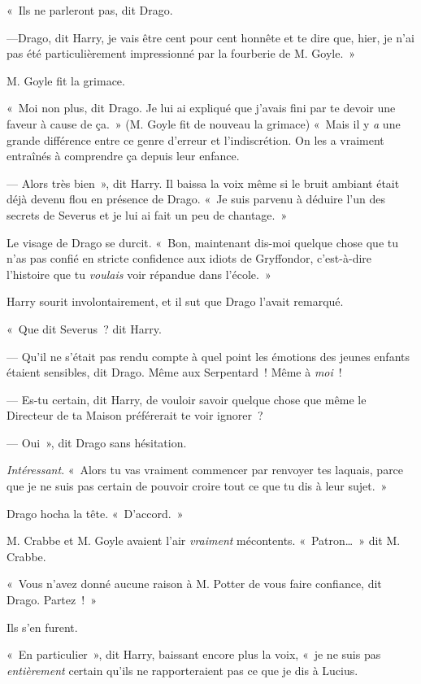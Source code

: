 «~Ils ne parleront pas, dit Drago.

---Drago, dit Harry, je vais être cent pour cent honnête et te dire que, hier, je n'ai pas été particulièrement impressionné par la fourberie de M. Goyle.~»

M. Goyle fit la grimace.

«~Moi non plus, dit Drago. Je lui ai expliqué que j'avais fini par te devoir une faveur à cause de ça.~» (M. Goyle fit de nouveau la grimace) «~Mais il y \emph{a} une grande différence entre ce genre d'erreur et l'indiscrétion. On les a vraiment entraînés à comprendre ça depuis leur enfance.

--- Alors très bien~», dit Harry. Il baissa la voix même si le bruit ambiant était déjà devenu flou en présence de Drago. «~Je suis parvenu à déduire l'un des secrets de Severus et je lui ai fait un peu de chantage.~»

Le visage de Drago se durcit. «~Bon, maintenant dis-moi quelque chose que tu n'as pas confié en stricte confidence aux idiots de Gryffondor, c'est-à-dire l'histoire que tu \emph{voulais} voir répandue dans l'école.~»

Harry sourit involontairement, et il sut que Drago l'avait remarqué.

«~Que dit Severus~? dit Harry.

--- Qu'il ne s'était pas rendu compte à quel point les émotions des jeunes enfants étaient sensibles, dit Drago. Même aux Serpentard~! Même à \emph{moi}~!

--- Es-tu certain, dit Harry, de vouloir savoir quelque chose que même le Directeur de ta Maison préférerait te voir ignorer~?

--- Oui~», dit Drago sans hésitation.

\emph{Intéressant}. «~Alors tu vas vraiment commencer par renvoyer tes laquais, parce que je ne suis pas certain de pouvoir croire tout ce que tu dis à leur sujet.~»

Drago hocha la tête. «~D'accord.~»

M. Crabbe et M. Goyle avaient l'air \emph{vraiment} mécontents. «~Patron…~» dit M. Crabbe.

«~Vous n'avez donné aucune raison à M. Potter de vous faire confiance, dit Drago. Partez~!~»

Ils s'en furent.

«~En particulier~», dit Harry, baissant encore plus la voix, «~je ne suis pas \emph{entièrement} certain qu'ils ne rapporteraient pas ce que je dis à Lucius.


